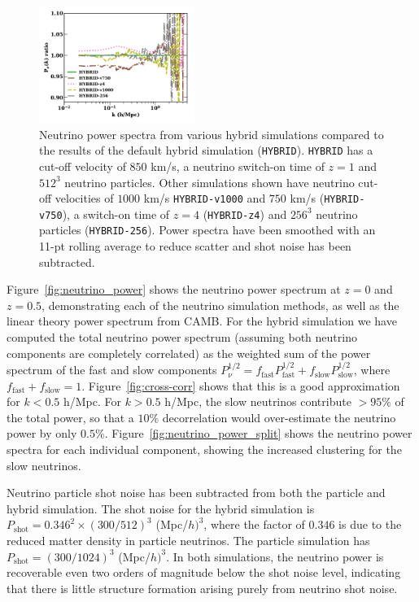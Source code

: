 \documentclass[useAMS, usenatbib]{mnras}
\begin{document}
\begin{figure}
  \includegraphics[width=0.45\textwidth]{nuplots/pks_nu_ckrel-1.pdf}
  \caption{Neutrino power spectra from various hybrid simulations compared to the results of the default hybrid simulation (\texttt{HYBRID}). \texttt{HYBRID} has a cut-off velocity of $850$ km/s, a neutrino switch-on time of $z=1$ and $512^3$ neutrino particles. Other simulations shown have neutrino cut-off velocities of $1000$ km/s \texttt{HYBRID-v1000} and $750$ km/s (\texttt{HYBRID-v750}), a switch-on time of $z=4$  (\texttt{HYBRID-z4}) and $256^3$ neutrino particles (\texttt{HYBRID-256}). Power spectra have been smoothed with an 11-pt rolling average to reduce scatter and shot noise has been subtracted.}
  \label{fig:vcrit}
\end{figure}

Figure~\ref{fig:neutrino_power} shows the neutrino power spectrum at $z=0$ and $z=0.5$, demonstrating each of the neutrino simulation methods, as well as the linear theory power spectrum from CAMB. For the hybrid simulation we have computed the total neutrino power spectrum (assuming both neutrino components are completely correlated) as the weighted sum of the power spectrum of the fast and slow components $P^{1/2}_\nu = f_\mathrm{fast} P^{1/2}_\mathrm{fast} + f_\mathrm{slow} P^{1/2}_\mathrm{slow}$, where $f_\mathrm{fast} + f_\mathrm{slow} = 1$. Figure~\ref{fig:cross-corr} shows that this is a good approximation for $k < 0.5$ h/Mpc. For $k > 0.5$ h/Mpc, the slow neutrinos contribute $> 95\%$ of the total power, so that a $10\%$ decorrelation would over-estimate the neutrino power by only $0.5\%$. Figure~\ref{fig:neutrino_power_split} shows the neutrino power spectra for each individual component, showing the increased clustering for the slow neutrinos.

Neutrino particle shot noise has been subtracted from both the particle and hybrid simulation. The shot noise for the hybrid simulation is $P_\mathrm{shot} = 0.346^2\times (300 /512)^3 $ (Mpc/$h)^3$, where the factor of $0.346$ is due to the reduced matter density in particle neutrinos. The particle simulation has $P_\mathrm{shot} = (300 /1024)^3$ (Mpc/$h)^3$. In both simulations, the neutrino power is recoverable even two orders of magnitude below the shot noise level, indicating that there is little structure formation arising purely from neutrino shot noise.
\end{document}
